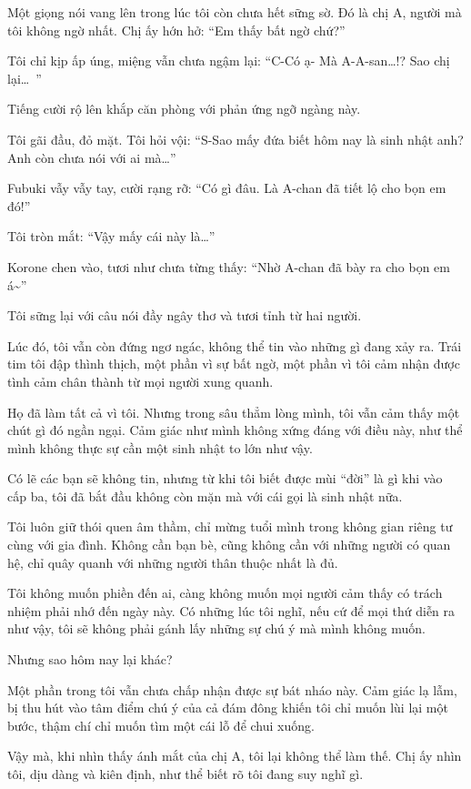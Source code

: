\documentclass[../main.tex]{subfiles}
\begin{document}
Một giọng nói vang lên trong lúc tôi còn chưa hết sững sờ. Đó là chị A, người mà tôi không ngờ nhất. Chị ấy hớn hở: ``Em thấy bất ngờ chứ?''

Tôi chỉ kịp ấp úng, miệng vẫn chưa ngậm lại: ``C-Có ạ- Mà A-A-san\dots!? Sao chị lại\dots\ ''

Tiếng cười rộ lên khắp căn phòng với phản ứng ngỡ ngàng này.

Tôi gãi đầu, đỏ mặt. Tôi hỏi vội: ``S-Sao mấy đứa biết hôm nay là sinh nhật anh? Anh còn chưa nói với ai mà\dots''

Fubuki vẫy vẫy tay, cười rạng rỡ: ``Có gì đâu. Là A-chan đã tiết lộ cho bọn em đó!''

Tôi tròn mắt: ``Vậy mấy cái này là\dots''

Korone chen vào, tươi như chưa từng thấy: ``Nhờ A-chan đã bày ra cho bọn em á\~{}''

Tôi sững lại với câu nói đầy ngây thơ và tươi tỉnh từ hai người.

Lúc đó, tôi vẫn còn đứng ngơ ngác, không thể tin vào những gì đang xảy ra. Trái tim tôi đập thình thịch, một phần vì sự bất ngờ, một phần vì tôi cảm nhận được tình cảm chân thành từ mọi người xung quanh.

Họ đã làm tất cả vì tôi. Nhưng trong sâu thẳm lòng mình, tôi vẫn cảm thấy một chút gì đó ngần ngại. Cảm giác như mình không xứng đáng với điều này, như thể mình không thực sự cần một sinh nhật to lớn như vậy.

Có lẽ các bạn sẽ không tin, nhưng từ khi tôi biết được mùi ``đời'' là gì khi vào cấp ba, tôi đã bắt đầu không còn mặn mà với cái gọi là sinh nhật nữa.

Tôi luôn giữ thói quen âm thầm, chỉ mừng tuổi mình trong không gian riêng tư cùng với gia đình. Không cần bạn bè, cũng không cần với những người có quan hệ, chỉ quây quanh với những người thân thuộc nhất là đủ.

Tôi không muốn phiền đến ai, càng không muốn mọi người cảm thấy có trách nhiệm phải nhớ đến ngày này. Có những lúc tôi nghĩ, nếu cứ để mọi thứ diễn ra như vậy, tôi sẽ không phải gánh lấy những sự chú ý mà mình không muốn.

Nhưng sao hôm nay lại khác?

Một phần trong tôi vẫn chưa chấp nhận được sự bát nháo này. Cảm giác lạ lẫm, bị thu hút vào tâm điểm chú ý của cả đám đông khiến tôi chỉ muốn lùi lại một bước, thậm chí chỉ muốn tìm một cái lỗ để chui xuống.

Vậy mà, khi nhìn thấy ánh mắt của chị A, tôi lại không thể làm thế. Chị ấy nhìn tôi, dịu dàng và kiên định, như thể biết rõ tôi đang suy nghĩ gì.
\end{document}
